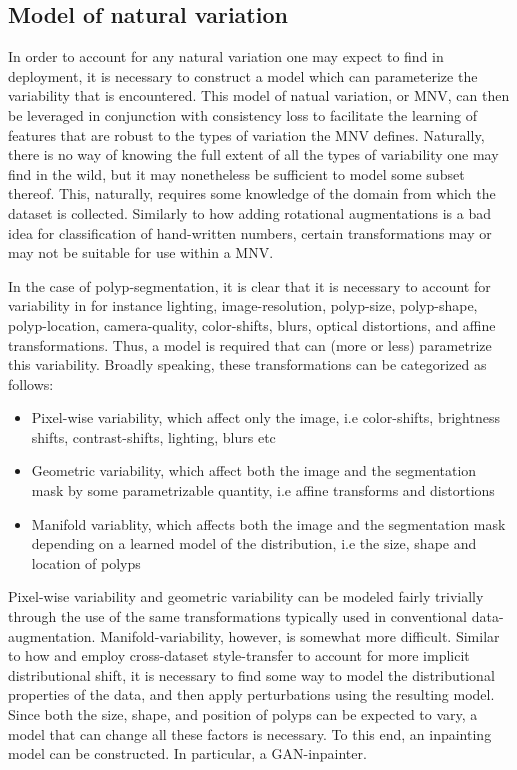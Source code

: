   	\subsection{Model of natural variation}
  		In order to account for any natural variation one may expect to find in deployment, it is necessary to construct a model which can parameterize the variability that is encountered. This model of natual variation, or MNV, can then be leveraged in conjunction with consistency loss to facilitate the learning of features that are robust to the types of variation the MNV defines. Naturally, there is no way of knowing the full extent of all the types of variability one may find in the wild, but it may nonetheless be sufficient to model some subset thereof. This, naturally, requires some knowledge of the domain from which the dataset is collected. Similarly to how adding rotational augmentations is a bad idea for classification of hand-written numbers, certain transformations may or may not be suitable for use within a MNV.
  		
  		In the case of polyp-segmentation, it is clear that it is necessary to account for variability in for instance lighting, image-resolution, polyp-size, polyp-shape, polyp-location, camera-quality, color-shifts, blurs, optical distortions, and affine transformations. Thus, a model is required that can (more or less) parametrize this variability. Broadly speaking, these transformations can be categorized as follows:
  		\begin{itemize}
  			\item Pixel-wise variability, which affect only the image, i.e color-shifts, brightness shifts, contrast-shifts, lighting, blurs etc
  			\item Geometric variability, which affect both the image and the segmentation mask by some parametrizable quantity, i.e affine transforms and distortions
  			\item Manifold variablity, which affects both the image and the segmentation mask depending on a learned model of the distribution,  i.e the size, shape and location of polyps
  		\end{itemize}
  		Pixel-wise variability and geometric variability can be modeled fairly trivially through the use of the same transformations typically used in conventional data-augmentation. Manifold-variability, however, is somewhat more difficult. Similar to how \cite{modelbased} and \cite{cyclegan} employ cross-dataset style-transfer to account for more implicit distributional shift, it is necessary to find some way to model the distributional properties of the data, and then apply perturbations using the resulting model. Since both the size, shape, and position of polyps can be expected to vary, a model that can change all these factors is necessary. To this end, an inpainting model can be constructed. In particular, a GAN-inpainter. 
